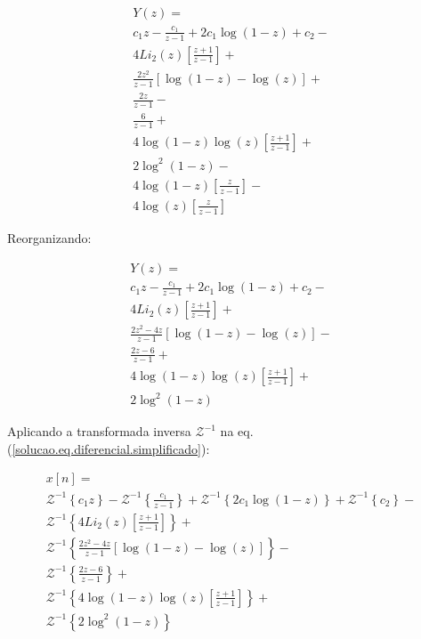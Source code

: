 \documentclass[a4paper,10pt]{article}
\begin{document}
$$
\begin{array}{lcl} 
 Y(z) = \\
 c_1z - \displaystyle \frac{c_1}{z-1}+ 2 c_1  \log(1-z)+ c_2-\\
 4 Li_2(z)\left[\displaystyle \frac{z + 1}{z-1}\right]+\\
 \displaystyle \frac{2 z^2 }{z-1}\displaystyle \left[\log(1-z) - \log(z)\right]+\\
 \displaystyle \frac{2 z}{z-1}-\\
 \displaystyle \frac{6}{z-1}+\\
 4 \log(1-z)\log(z) \left[\displaystyle \frac{ z  + 1}{z-1}\right]+\\
 2 \log^2(1-z) - \\
 4 \log(1-z) \left[\displaystyle \frac{ z }{z-1}\right]-\\
 4 \log(z)\left[\displaystyle \frac{ z }{z-1}\right]
\end{array}
$$

Reorganizando:

\begin{equation}
\begin{array}{lcl} 
 Y(z) = \\
 c_1z - \displaystyle \frac{c_1}{z-1}+ 2 c_1  \log(1-z)+ c_2-\\
 4 Li_2(z)\left[\displaystyle \frac{z + 1}{z-1}\right]+\\
 \displaystyle \frac{2 z^2 - 4z}{z-1}\displaystyle \left[\log(1-z) - \log(z)\right] -\\
 \displaystyle \frac{2 z - 6}{z-1}+\\
 4 \log(1-z)\log(z) \left[\displaystyle \frac{ z  + 1}{z-1}\right]+\\
 2 \log^2(1-z)
\end{array} 
\label{solucao.eq.diferencial.simplificado}
\end{equation}


Aplicando a transformada  inversa $\mathcal{Z}^{-1}$ na eq. (\ref{solucao.eq.diferencial.simplificado}):


$$
\begin{array}{lcl} 
 x[n] = \\
 \mathcal{Z}^{-1}\left\{c_1z\right\} - 
 \mathcal{Z}^{-1}\left\{\displaystyle \frac{c_1}{z-1}\right\} + 
 \mathcal{Z}^{-1}\left\{2 c_1  \log(1-z)\right\} + 
 \mathcal{Z}^{-1}\left\{c_2\right\}-\\
 \mathcal{Z}^{-1}\left\{4 Li_2(z)\left[\displaystyle \frac{z + 1}{z-1}\right]\right\}+\\
 \mathcal{Z}^{-1}\left\{\displaystyle \frac{2 z^2 - 4z}{z-1}\displaystyle \left[\log(1-z) - \log(z)\right]\right\} -\\
 \mathcal{Z}^{-1}\left\{\displaystyle \frac{2 z - 6}{z-1}\right\}+\\
 \mathcal{Z}^{-1}\left\{4 \log(1-z)\log(z) \left[\displaystyle \frac{ z  + 1}{z-1}\right]\right\}+\\
 \mathcal{Z}^{-1}\left\{2 \log^2(1-z)\right\}
\end{array} 
$$
\end{document}
